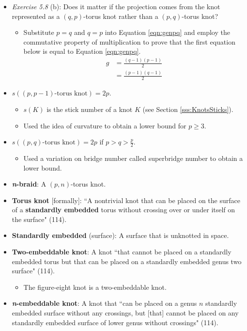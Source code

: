 \documentclass[titlepage]{article}
\numberwithin{figure}{section}
\numberwithin{table}{section}
\numberwithin{equation}{section}
\newcommand{\dq}[2]{``#1" (#2).}
\begin{document}
\begin{itemize}
\begin{itemize}
    \end{itemize}
    \item \emph{Exercise 5.8} (b): Does it matter if the projection comes from the knot represented as a $(q,p)$-torus knot rather than a $(p,q)$-torus knot?
    \begin{itemize}
        \item Substitute $p=q$ and $q=p$ into Equation \ref{eqn:genpq} and employ the commutative property of multiplication to prove that the first equation below is equal to Equation \ref{eqn:genpq}.
        \begin{align*}
            g &=\frac{(q-1)(p-1)}{2}\\
            &=\frac{(p-1)(q-1)}{2}
        \end{align*}
    \end{itemize}
    \item $s((p,p-1)\text{-torus knot})=2p$.
    \begin{itemize}
        \item $s(K)$ is the stick number of a knot $K$ (see Section \ref{sss:KnotsSticks}).
        \item Used the idea of curvature to obtain a lower bound for $p\geq 3$.
    \end{itemize}
    \item $s((p,q)\text{-torus knot})=2p$ if $p>q>\frac{p}{2}$.
    \begin{itemize}
        \item Used a variation on bridge number called superbridge number to obtain a lower bound.
    \end{itemize}
    \item \textbf{\emph{n}-braid}: A $(p,n)$-torus knot.
    \item \textbf{Torus knot} [formally]: \dq{A nontrivial knot that can be placed on the surface of a \textbf{standardly embedded} torus without crossing over or under itself on the surface}{114}
    \item \textbf{Standardly embedded} (surface): A surface that is unknotted in space.
    \item \textbf{Two-embeddable knot}: A knot \dq{that cannot be placed on a standardly embedded torus but that can be placed on a standardly embedded genus two surface}{114}
    \begin{itemize}
        \item The figure-eight knot is a two-embeddable knot.
    \end{itemize}
    \item \textbf{\emph{n}-embeddable knot}: A knot that \dq{can be placed on a genus $n$ standardly embedded surface without any crossings, but [that] cannot be placed on any standardly embedded surface of lower genus without crossings}{114}

\end{itemize}
\end{document}
